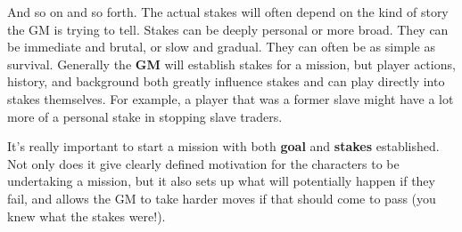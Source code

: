 And so on and so forth. The actual stakes will often depend on the kind of story the GM is trying to tell. Stakes can be deeply personal or more broad. They can be immediate and brutal, or slow and gradual. They can often be as simple as survival. Generally the \textbf{GM} will establish stakes for a mission, but player actions, history, and background both greatly influence stakes and can play directly into stakes themselves. For example, a player that was a former slave might have a lot more of a personal stake in stopping slave traders.

It’s really important to start a mission with both \textbf{goal} and \textbf{stakes} established. Not only does it give clearly defined motivation for the characters to be undertaking a mission, but it also sets up what will potentially happen if they fail, and allows the GM to take harder moves if that should come to pass (you knew what the stakes were!).